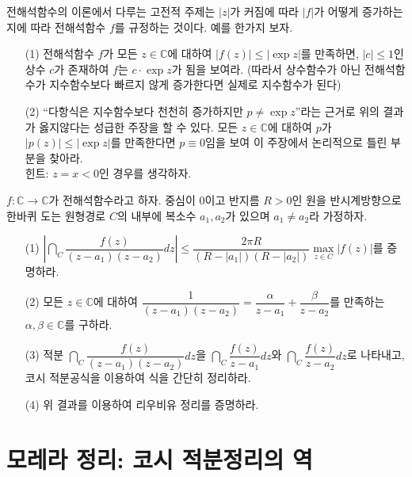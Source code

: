 \begin{salt_exercise} \label{ex-3-33}
전해석함수의 이론에서 다루는 고전적 주제는
$|z|$가 커짐에 따라 $|f|$가 어떻게 증가하는지에 따라 전해석함수 $f$를 규정하는 것이다.
예를 한가지 보자.
\begin{itemize}
\item[(1)] 전해석함수 $f$가 모든 $z\in\mathbb C$에 대하여 
$|f(z)| \le |\exp z|$를 만족하면, 
$|c|\le1$인 상수 $c$가 존재하여 $f$는 $c\cdot \exp z$가 됨을 보여라.
(따라서 상수함수가 아닌 전해석함수가 지수함수보다 빠르지 않게 증가한다면
실제로 지수함수가 된다)
\item[(2)] ``다항식은 지수함수보다 천천히 증가하지만 $p\ne \exp z$''라는 근거로
위의 결과가 옳지않다는 성급한 주장을 할 수 있다.
모든 $z\in\mathbb C$에 대하여 $p$가 $|p(z)|\le |\exp z|$를 만족한다면
$p\equiv0$임을 보여 이 주장에서 논리적으로 틀린 부분을 찾아라. \\
힌트: $z=x<0$인 경우를 생각하자.
\end{itemize}
\end{salt_exercise}

\begin{salt_exercise} \label{ex-3-34}
$f:\mathbb C \to \mathbb C$가 전해석함수라고 하자.
중심이 $0$이고 반지름 $R>0$인 원을 반시계방향으로 한바퀴 도는 원형경로 $C$의
내부에 복소수 $a_1, a_2$가 있으며 $a_1\ne a_2$라 가정하자.
\begin{itemize}
\item[(1)] $\left| \dint_C \dfrac{f(z)}{(z-a_1)(z-a_2)}dz \right| \le
\dfrac{2\pi R}{(R-|a_1|)(R-|a_2|)} \max\limits_{z\in C} |f(z)|$를 증명하라.
\item[(2)] 모든 $z\in \mathbb C$에 대하여
$\dfrac1{(z-a_1)(z-a_2)} = \dfrac\alpha{z-a_1} + \dfrac\beta{z-a_2}$를 만족하는
$\alpha, \beta \in \mathbb C$를 구하라.
\item[(3)] 적분 $\dint_C \dfrac{f(z)}{(z-a_1)(z-a_2)}dz$을
$\dint_C \dfrac{f(z)}{z-a_1}dz$와 $\dint_C \dfrac{f(z)}{z-a_2}dz$로 나타내고,
코시 적분공식을 이용하여 식을 간단히 정리하라.
\item[(4)] 위 결과를 이용하여 리우비유 정리를 증명하라.
\end{itemize}
\end{salt_exercise}

\section{모레라 정리: 코시 적분정리의 역}








